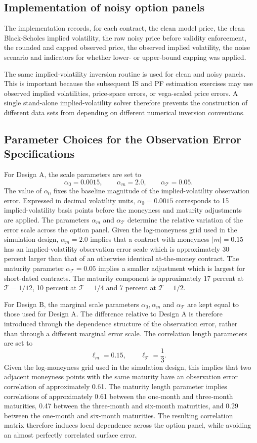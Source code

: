 \documentclass[11pt,a4paper,notitlepage]{article}
\numberwithin{equation}{section}
\begin{document}
\subsection{Implementation of noisy option panels}
The implementation records, for each contract, the clean model price, the clean Black-Scholes implied volatility,
the raw noisy price before validity enforcement, the rounded and capped observed price, the observed implied
volatility, the noise scenario and indicators for whether lower- or upper-bound capping was applied.

The same implied-volatility inversion routine is used for clean and noisy panels. This is important because
the subsequent IS and PF estimation exercises may use observed implied volatilities, price-space errors, or
vega-scaled price errors. A single stand-alone implied-volatility solver therefore prevents the construction of
different data sets from depending on different numerical inversion conventions.

\subsection{Parameter Choices for the Observation Error Specifications}
For Design A, the scale parameters are set to
\[
\alpha_0=0.0015,\qquad \alpha_m=2.0,\qquad \alpha_{\mathcal T}=0.05.
\]
The value of $\alpha_0$ fixes the baseline magnitude of the implied-volatility observation error. Expressed in decimal volatility units, $\alpha_0=0.0015$ corresponds to 15 implied-volatility basis points before the moneyness and maturity adjustments are applied. The parameters $\alpha_m$ and $\alpha_{\mathcal T}$ determine the relative variation of the error scale across the option panel. Given the log-moneyness grid used in the simulation design, $\alpha_m=2.0$ implies that a contract with moneyness $|m|=0.15$ has an implied-volatility observation error scale which is approximately 30 percent larger than that of an otherwise identical at-the-money contract. The maturity parameter $\alpha_{\mathcal T}=0.05$ implies a smaller adjustment which is largest for short-dated contracts. The maturity component is approximately 17 percent at $\mathcal T=1/12$, 10 percent at $\mathcal T=1/4$ and 7 percent at $\mathcal T=1/2$.

For Design B, the marginal scale parameters $\alpha_0, \alpha_m$ and $\alpha_{\mathcal T}$ are kept equal to those used for Design A. The difference relative to Design A is therefore introduced through the dependence structure of the observation error, rather than through a different marginal error scale. The correlation length parameters are set to
\[
\ell_m=0.15,\qquad \ell_{\mathcal T}=\frac{1}{3}.
\]
Given the log-moneyness grid used in the simulation design, this implies that two adjacent moneyness points with the same maturity have an observation error correlation of approximately 0.61. The maturity length parameter implies correlations of approximately 0.61 between the one-month and three-month maturities, 0.47 between the three-month and six-month maturities, and 0.29 between the one-month and six-month maturities. The resulting correlation matrix therefore induces local dependence across the option panel, while avoiding an almost perfectly correlated surface error. 
\end{document}
